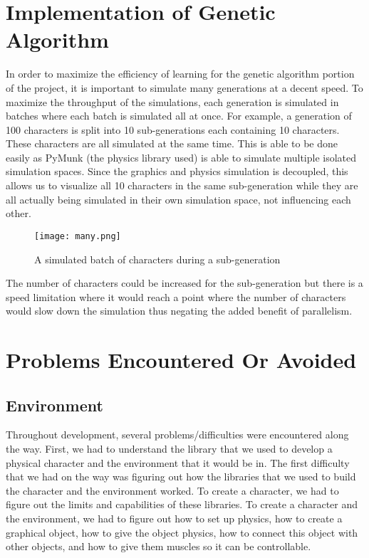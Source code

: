 \documentclass[letterpaper]{article} %
\begin{document}
\section{Implementation of Genetic Algorithm}

In order to maximize the efficiency of learning for the genetic algorithm portion of the project, it is important to simulate many generations at a decent speed. To maximize the throughput of the simulations, each generation is simulated in batches where each batch is simulated all at once. For example, a generation of 100 characters is split into 10 sub-generations each containing 10 characters. These characters are all simulated at the same time. This is able to be done easily as PyMunk (the physics library used) is able to simulate multiple isolated simulation spaces. Since the graphics and physics simulation is decoupled, this allows us to visualize all 10 characters in the same sub-generation while they are all actually being simulated in their own simulation space, not influencing each other.

\begin{figure}[h]
\caption{A simulated batch of characters during a sub-generation}
\centering
\texttt{[image: many.png]}
\end{figure}

\par The number of characters could be increased for the sub-generation but there is a speed limitation where it would reach a point where the number of characters would slow down the simulation thus negating the added benefit of parallelism.

\section{Problems Encountered Or Avoided}

\subsection{Environment}
Throughout development, several problems/difficulties were encountered along the way. First, we had to understand the library that we used to develop a physical character and the environment that it would be in. The first difficulty that we had on the way was figuring out how the libraries that we used to build the character and the environment worked. To create a character, we had to figure out the limits and capabilities of these libraries. To create a character and the environment, we had to figure out how to set up physics, how to create a graphical object, how to give the object physics, how to connect this object with other objects, and how to give them muscles so it can be controllable. 
\end{document}
